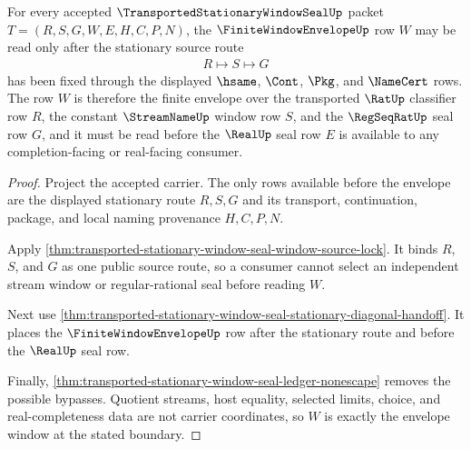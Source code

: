 \begin{theorem}
\label{thm:transported-stationary-window-seal-envelope-window-exactness}
For every accepted $\TransportedStationaryWindowSealUp$ packet $T=(R,S,G,W,E,H,C,P,N)$, the $\FiniteWindowEnvelopeUp$ row $W$ may be read only after the stationary source route
$$
\begin{aligned}
  R \longmapsto S \longmapsto G
\end{aligned}
$$
has been fixed through the displayed $\hsame$, $\Cont$, $\Pkg$, and $\NameCert$ rows. The row $W$ is therefore the finite envelope over the transported $\RatUp$ classifier row $R$, the constant $\StreamNameUp$ window row $S$, and the $\RegSeqRatUp$ seal row $G$, and it must be read before the $\RealUp$ seal row $E$ is available to any completion-facing or real-facing consumer.
\end{theorem}
\begin{proof}
Project the accepted carrier. The only rows available before the envelope are the displayed stationary route $R,S,G$ and its transport, continuation, package, and local naming provenance $H,C,P,N$.

Apply \autoref{thm:transported-stationary-window-seal-window-source-lock}. It binds $R$, $S$, and $G$ as one public source route, so a consumer cannot select an independent stream window or regular-rational seal before reading $W$.

Next use \autoref{thm:transported-stationary-window-seal-stationary-diagonal-handoff}. It places the $\FiniteWindowEnvelopeUp$ row after the stationary route and before the $\RealUp$ seal row.

Finally, \autoref{thm:transported-stationary-window-seal-ledger-nonescape} removes the possible bypasses. Quotient streams, host equality, selected limits, choice, and real-completeness data are not carrier coordinates, so $W$ is exactly the envelope window at the stated boundary.
\end{proof}

